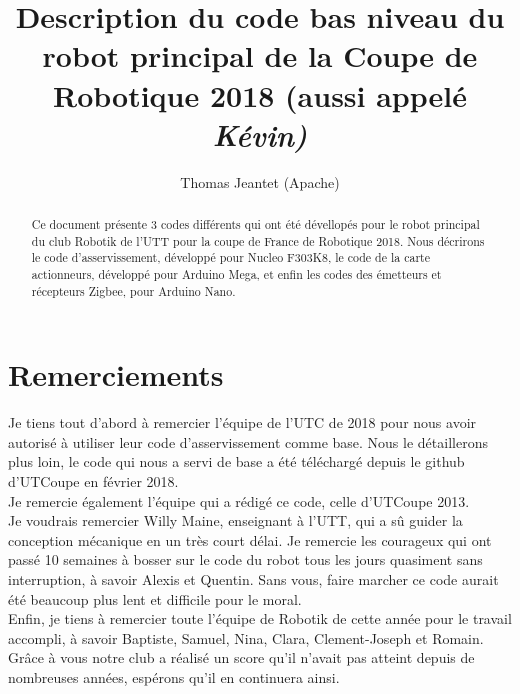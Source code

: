 \documentclass{article}
\title{Description du code bas niveau du robot principal de la Coupe de Robotique 2018 (aussi appelé \it{Kévin})}
\author{Thomas Jeantet (Apache)}
\date{}
\begin{document}
	
	
	\maketitle
	
	
	\begin{abstract}
		Ce document présente 3 codes différents qui ont été dévellopés pour le robot principal du club Robotik de l'UTT pour la coupe de France de Robotique 2018. Nous décrirons le code d'asservissement, développé pour Nucleo F303K8, le code de la carte actionneurs, développé pour Arduino Mega, et enfin les codes des émetteurs et récepteurs Zigbee, pour Arduino Nano.
	\end{abstract}
	
	\tableofcontents
	\newpage
	
		\section*{Remerciements}
			Je tiens tout d'abord à remercier l'équipe de l'UTC de 2018 pour nous avoir autorisé à utiliser leur code d'asservissement comme base. Nous le détaillerons plus loin, le code qui nous a servi de base a été téléchargé depuis le github d'UTCoupe en février 2018. \\
			Je remercie également l'équipe qui a rédigé ce code, celle d'UTCoupe 2013. \\
			Je voudrais remercier Willy Maine, enseignant à l'UTT, qui a sû guider la conception mécanique en un très court délai.
			Je remercie les courageux qui ont passé 10 semaines à bosser sur le code du robot tous les jours quasiment sans interruption, à savoir Alexis et Quentin. Sans vous, faire marcher ce code aurait été beaucoup plus lent et difficile pour le moral.\\
			Enfin, je tiens à remercier toute l'équipe de Robotik de cette année pour le travail accompli, à savoir Baptiste, Samuel, Nina, Clara, Clement-Joseph et Romain. Grâce à vous notre club a réalisé un score qu'il n'avait pas atteint depuis de nombreuses années, espérons qu'il en continuera ainsi. 
	\newpage
\end{document}
